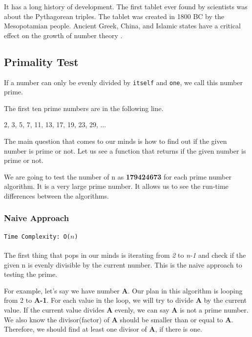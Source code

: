 \documentclass[12pt]{article}
\begin{document}
It has a long history of development. The first tablet ever found by scientists was about the Pythagorean triples. The tablet was created in 1800 BC by the Mesopotamian people. Ancient Greek, China, and Islamic states have a critical effect on the growth of number theory \cite{wikipedianumbertheory}.


\subsection{Primality Test}
If a number can only be evenly divided by \texttt{itself} and \texttt{one}, we call this number prime.

The first ten prime numbers are in the following line. 

2, 3, 5, 7, 11, 13, 17, 19, 23, 29, ...

The main question that comes to our minds is how to find out if the given number is prime or not. Let us see a function that returns if the given number is prime or not.  

We are going to test the number of n as \textbf{179424673} for each prime number algorithm.  It is a very large prime number. It allows us to see the run-time differences between the algorithms.
\clearpage

\subsubsection{Naive Approach}
\texttt{Time Complexity: O($n$)} \\ \\
The first thing that pops in our minds is iterating from \textit{2} to \textit{n-1} and check if the given n is evenly divisible by the current number. This is the naive approach to testing the prime.

For example, let's say we have number \textbf{A}. Our plan in this algorithm is looping from 2 to \textbf{A-1}. For each value in the loop, we will try to divide \textbf{A} by the current value. If the current value divides \textbf{A} evenly, we can say \textbf{A} is not a prime number.  We also know the divisor(factor) of \textbf{A} should be smaller than or equal to \textbf{A}.  Therefore,  we should find at least one divisor of \textbf{A}, if there is one.
\end{document}
